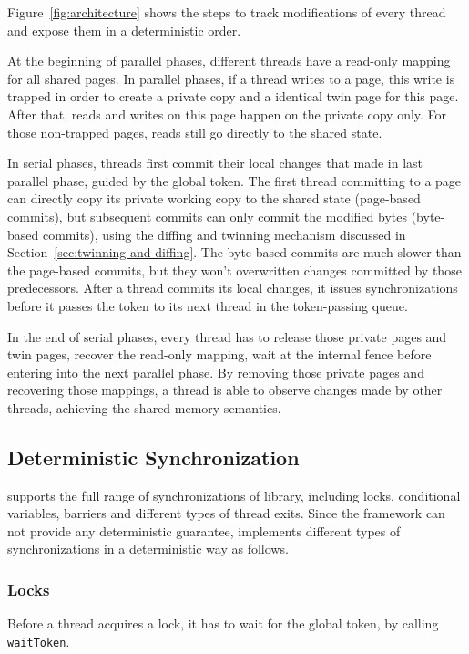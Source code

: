 Figure~\ref{fig:architecture} shows the steps to track modifications of every thread and expose them in a deterministic order.  

At the beginning of parallel phases, different threads have a read-only mapping for all shared pages. In parallel phases, if a thread writes to a page, this write is trapped in order to create a private copy and a identical twin page for this page. After that, reads and writes on this page happen on the private copy only. For those non-trapped pages, reads still go directly to the shared state.  

In serial phases, threads first commit their local changes that made in last parallel phase, guided by the global token.  The first thread  committing to a page can directly copy its private working copy to the shared state (page-based commits), but subsequent commits can only commit the modified bytes (byte-based commits), using the diffing and twinning mechanism discussed in Section~\ref{sec:twinning-and-diffing}. The byte-based commits are much slower than the page-based commits, but  they won't overwritten changes committed by those predecessors.  After a thread commits its local changes, it issues synchronizations before it passes the token to its next thread in the token-passing queue. 

In the end of serial phases, every thread has to release those private pages and twin pages, recover the read-only mapping, wait at the internal fence before entering into the next parallel phase. By removing those private pages and recovering those mappings, a thread is able to observe changes made by other threads, achieving the shared memory semantics. 

\subsection{Deterministic Synchronization}
\label{sec:synchronization}

\dthreads{} supports the full range of synchronizations of \pthreads{} library, including locks, conditional variables, barriers and different types of thread exits. Since the \sheriff{} framework can not provide any deterministic guarantee, \dthreads{} implements different types of synchronizations in a deterministic way as follows. 

\subsubsection{Locks}
Before a thread acquires a lock, it has to wait for the global token, by calling \texttt{waitToken}. 

